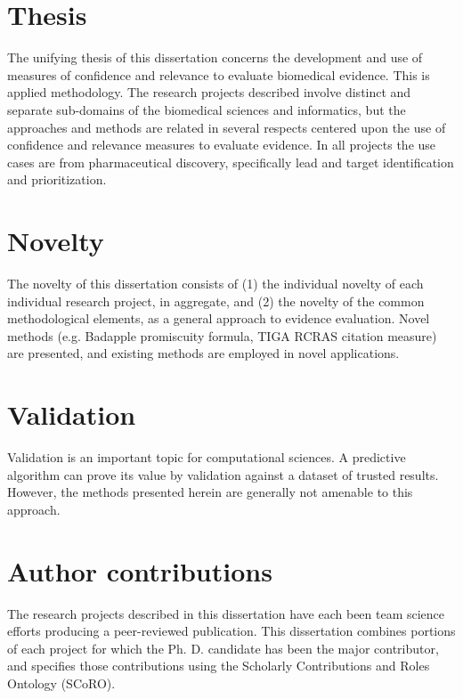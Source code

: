 \section{Thesis}

The unifying thesis of this dissertation concerns the development and use of measures of confidence and relevance to evaluate biomedical evidence. This is applied methodology. The research projects described involve distinct and separate sub-domains of the biomedical sciences and informatics, but the approaches and methods are related in several respects centered upon the use of confidence and relevance measures to evaluate evidence. In all projects the use cases are from pharmaceutical discovery, specifically lead and target identification and prioritization.  

\section{Novelty}

The novelty of this dissertation consists of (1) the individual novelty of each individual research project, in aggregate, and (2) the novelty of the common methodological elements, as a general approach to evidence evaluation. Novel methods (e.g. Badapple promiscuity formula, TIGA RCRAS citation measure) are presented, and existing methods are employed in novel applications.

\section{Validation}

Validation is an important topic for computational sciences. A predictive algorithm can prove its value by validation against a dataset of trusted results. However, the methods presented herein are generally not amenable to this approach. 

\section{Author contributions}

The research projects described in this dissertation have each been team science efforts producing a peer-reviewed publication. This dissertation combines portions of each project for which the Ph. D. candidate has been the major contributor, and specifies those contributions using the Scholarly Contributions and Roles Ontology (SCoRO)\cite{Shotton2020-ph}. 